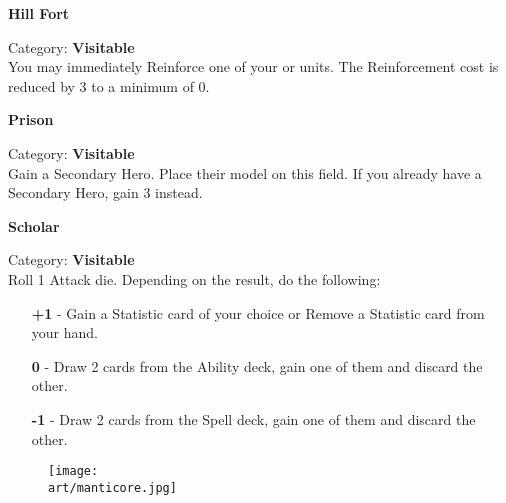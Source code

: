 \begin{multicols}{2}
\medskip

\begin{minipage}{\linewidth}
  \begin{center}
    \textbf{Hill Fort}\medskip
  \end{center}
  \small{Category: \textbf{Visitable}\\
    You may immediately Reinforce one of your  or  units.
    The Reinforcement cost is reduced by 3  to a minimum of 0.}
\end{minipage}

\medskip

\begin{minipage}{\linewidth}
  \begin{center}
    \textbf{Prison}\medskip
  \end{center}
  \small{Category: \textbf{Visitable}\\
    Gain a Secondary Hero.
    Place their model on this field.
    If you already have a Secondary Hero, gain 3  instead.}
\end{minipage}

\medskip

\begin{minipage}{\linewidth}
  \begin{center}
    \textbf{Scholar}\par\medskip
  \end{center}
  \small{Category: \textbf{Visitable}\\
    Roll 1 Attack die.
    Depending on the result, do the following:
    \begin{itemize}
      \setlength\itemsep{-0.2em}
      \item[ \textbf{+1}] - Gain a Statistic card of your choice or Remove a Statistic card from your hand.
      \item[\textbf{0}] - Draw 2 cards from the Ability deck, gain one of them and discard the other.
      \item[\textbf{-1}] - Draw 2 cards from the Spell deck, gain one of them and discard the other.
      \end{itemize}
     }
\end{minipage}

\end{multicols}

\vspace*{\fill}

\begin{figure*}[!hb]
  \centering
  \texttt{[image: \\art/manticore.jpg]}
\end{figure*}
